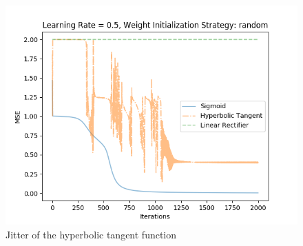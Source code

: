 \documentclass{article}
\begin{document}
\begin{figure}[H]
	\centering
	\includegraphics[width=0.9\linewidth]{img/5/tangent-jitter.png}
	\caption{Jitter of the hyperbolic tangent function}
	\label{fig:tangent-jitter}
\end{figure}
\end{document}

